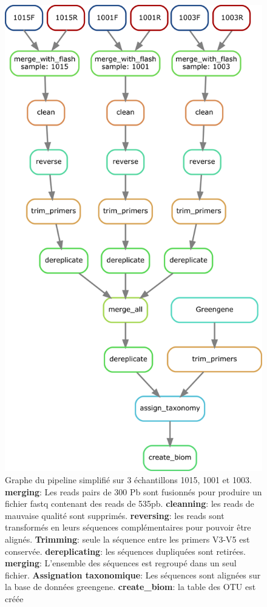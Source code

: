 \documentclass[12pt,a4paper]{article}
\begin{document}
\begin{figure}[!ht]
\begin{center}
\includegraphics[scale=0.5]{img/pipeline_trio.png}\hfill
\end{center}
\caption{Graphe du pipeline simplifié sur 3 échantillons 1015, 1001 et 1003.\\ \textbf{merging}: Les reads pairs de 300 Pb sont fusionnés  pour produire un fichier fastq contenant des reads de 535pb. \textbf{cleanning}: les reads de mauvaise qualité sont supprimés. \textbf{reversing}: les reads sont transformés en leurs séquences complémentaires pour pouvoir être alignés. \textbf{Trimming}: seule la séquence entre les primers V3-V5 est conservée. \textbf{dereplicating}: les séquences dupliquées sont retirées. \textbf{merging}: L'ensemble des séquences est regroupé dans un seul fichier. \textbf{Assignation taxonomique}: Les séquences sont alignées sur la base de données greengene. \textbf{create\_biom}: la table des OTU est créée }
\label{pipeline_trio}
\end{figure}
\end{document}
